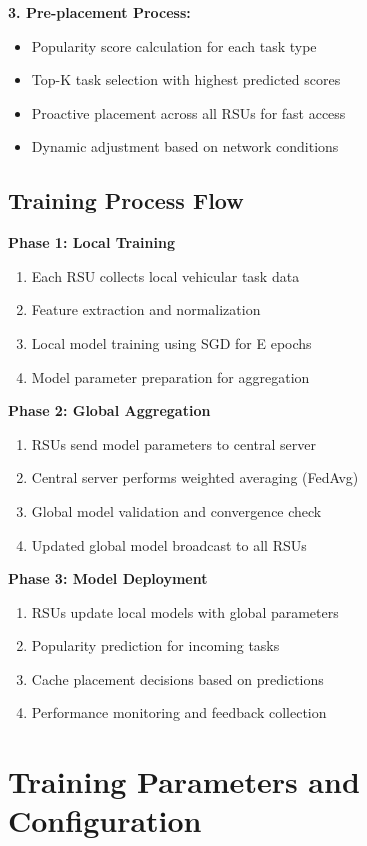 \documentclass[11pt]{article}
\begin{document}
\textbf{3. Pre-placement Process:}
\begin{itemize}
    \item Popularity score calculation for each task type
    \item Top-K task selection with highest predicted scores
    \item Proactive placement across all RSUs for fast access
    \item Dynamic adjustment based on network conditions
\end{itemize}

\subsection{Training Process Flow}

\textbf{Phase 1: Local Training}
\begin{enumerate}
    \item Each RSU collects local vehicular task data
    \item Feature extraction and normalization
    \item Local model training using SGD for E epochs
    \item Model parameter preparation for aggregation
\end{enumerate}

\textbf{Phase 2: Global Aggregation}
\begin{enumerate}
    \item RSUs send model parameters to central server
    \item Central server performs weighted averaging (FedAvg)
    \item Global model validation and convergence check
    \item Updated global model broadcast to all RSUs
\end{enumerate}

\textbf{Phase 3: Model Deployment}
\begin{enumerate}
    \item RSUs update local models with global parameters
    \item Popularity prediction for incoming tasks
    \item Cache placement decisions based on predictions
    \item Performance monitoring and feedback collection
\end{enumerate}

\section{Training Parameters and Configuration}
\end{document}
